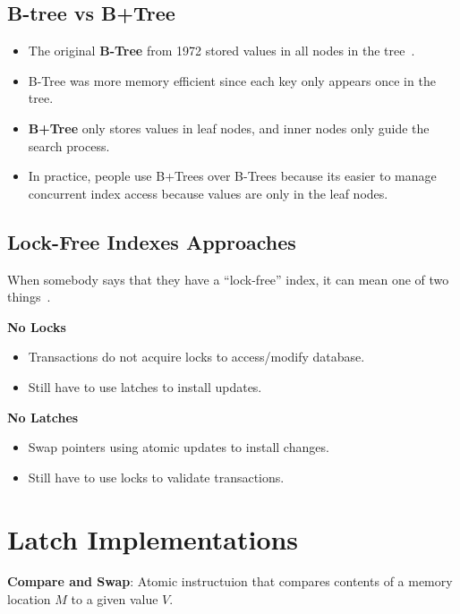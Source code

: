 \documentclass[11pt]{article}
\begin{document}
\subsection*{B-tree vs B+Tree}
\begin{itemize}
    \item
    The original \textbf{B-Tree} from 1972 stored values in all nodes in the tree~\cite{comer79}.
    
    \item
    B-Tree was more memory efficient since each key only appears once in the tree.
    
    \item
    \textbf{B+Tree} only stores values in leaf nodes, and inner nodes only guide the search
    process.
    
    \item
    In practice, people use B+Trees over B-Trees because its easier to manage concurrent 
    index access because values are only in the leaf nodes.
\end{itemize}

\subsection*{Lock-Free Indexes Approaches}
When somebody says that they have a ``lock-free'' index, it can mean one of two 
things~\cite{graefe10}.

\textbf{No Locks}
\begin{itemize}
    \item Transactions do not acquire locks to access/modify database.
    \item Still have to use latches to install updates.
\end{itemize}

\textbf{No Latches}
\begin{itemize}
    \item Swap pointers using atomic updates to install changes.
    \item Still have to use locks to validate transactions.
\end{itemize}

\section{Latch Implementations}
\textbf{Compare and Swap}: Atomic instructuion that compares contents of a memory location $M$ to a 
given value $V$.
\end{document}
